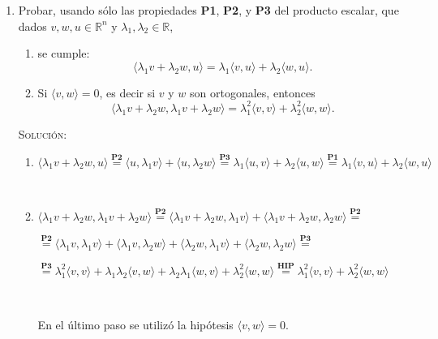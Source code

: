 \documentclass[a4paper,12pt,twoside,spanish,reqno]{amsbook}
\numberwithin{equation}{section}
\newcommand{\rta}{\noindent\textsc{Solución: }}
\begin{document}
\begin{enumerate}
\item Probar, usando s\'olo las propiedades \textbf{P1}, \textbf{P2}, y \textbf{P3} del producto escalar, que dados $v, w, u \in \mathbb R^n$ y $\lambda_1, \lambda_2 \in \mathbb R$, 
\begin{enumerate}
	\item se cumple:
	\begin{equation*}
	\langle \lambda_1 v + \lambda_2 w , u  \rangle =  \lambda_1\langle v , u  \rangle +   \lambda_2\langle w , u  \rangle.
	\end{equation*}
	\item Si $\langle v , w  \rangle =0$, es decir si $v$ y $w$ son ortogonales,  entonces
	\begin{equation*}
		\langle \lambda_1 v + \lambda_2 w ,  \lambda_1 v + \lambda_2 w   \rangle =
		\lambda_1^2 \langle  v ,  v  \rangle + \lambda_2^2 \langle w,w  \rangle.
	\end{equation*}
\end{enumerate}

\rta 

\begin{enumerate}
\item $\langle \lambda_1 v + \lambda_2 w , u  \rangle \overset{\textbf{P2}}{=} \langle u , \lambda_1 v \rangle + \langle u , \lambda_2 w \rangle \overset{\textbf{P3}}{=} \lambda_1 \langle u,v \rangle + \lambda_2 \langle u,w \rangle \overset{\textbf{P1}}{=} \lambda_1 \langle v,u \rangle + \lambda_2 \langle w,u \rangle$

\

\item $ \langle \lambda_1 v + \lambda_2 w, \lambda_1 v + \lambda_2 w \rangle \overset{\textbf{P2}}{=} \langle \lambda_1 v + \lambda_2 w, \lambda_1 v \rangle + \langle \lambda_1 v + \lambda_2 w, \lambda_2 w \rangle \overset{\textbf{P2}}{=} $

$ \overset{\textbf{P2}}{=} \langle \lambda_1 v , \lambda_1 v \rangle + \langle \lambda_1 v, \lambda_2 w \rangle + \langle \lambda_2 w, \lambda_1 v \rangle + \langle \lambda_2 w, \lambda_2 w \rangle \overset{\textbf{P3}}{=} $

$ \overset{\textbf{P3}}{=} \lambda_1^2 \langle v , v \rangle + \lambda_1 \lambda_2 \langle v, w \rangle + \lambda_2 \lambda_1 \langle w, v \rangle + \lambda_2^2 \langle w, w \rangle \overset{\textbf{HIP}}{=} \lambda_1^2 \langle v , v \rangle + \lambda_2^2 \langle w, w \rangle $

\ 

En el último paso se utilizó la hipótesis $\langle v , w  \rangle =0$.


\end{enumerate}
\end{enumerate}
\end{document}
